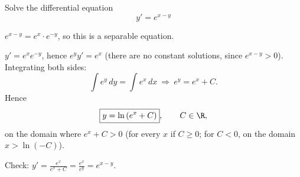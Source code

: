 
\begin{question}
Solve the differential equation
\[ y'=e^{x-y} \]
\end{question}

\begin{hint}
$e^{x-y}=e^x\cdot e^{-y}$, so this is a separable equation.
\end{hint}

\begin{solution}
$y'=e^x e^{-y}$, hence $e^{y}y'=e^x$ (there are no constant solutions, since $e^{x-y}>0$). Integrating both sides:
\[ \int e^y\,dy=\int e^x\,dx\ \Longrightarrow\ e^y=e^x+C. \]
Hence
\[ \boxed{y=\ln\left(e^x+C\right)},\qquad C\in\R, \]
on the domain where $e^x+C>0$ (for every $x$ if $C\ge0$; for $C<0$, on the domain $x>\ln(-C)$).

Check: $y'=\frac{e^x}{e^x+C}=\frac{e^x}{e^y}=e^{x-y}$.
\end{solution}
